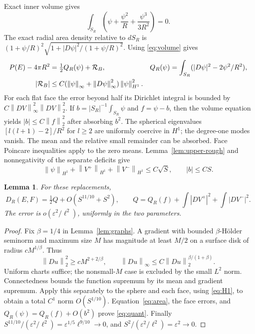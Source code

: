 \documentclass[11pt]{article}
\newcommand{\eps}{\varepsilon}
\newcommand{\norm}[1]{\left\|#1\right\|}
\newtheorem{lemma}[theorem]{Lemma}
\theoremstyle{remark}\newtheorem{remark}[theorem]{Remark}
\numberwithin{equation}{section}
\begin{document}
Exact inner volume gives
\begin{equation}
 \int_{S_R}\left(\psi+\frac{\psi^2}{R}
                  +\frac{\psi^3}{3R^2}\right)=0.\label{eq:volume}
\end{equation}
The exact radial area density relative to $dS_R$ is
$(1+\psi/R)^2\sqrt{1+|D\psi|^2/(1+\psi/R)^2}$.
Using \eqref{eq:volume} gives
\begin{align}
 P(E)-4\pi R^2&=\tfrac12 Q_R(\psi)+\mathcal R_B,
 &Q_R(\psi)&=\int_{S_R}(|D\psi|^2-2\psi^2/R^2),\label{eq:area}\\
 |\mathcal R_B|&\leq C(\norm\psi_\infty+
 \norm{D\psi}_\infty^2)\norm\psi_{H^1}^2.\notag
\end{align}
For each flat face the error beyond half its Dirichlet integral is bounded
by $C\norm{DV}_\infty^2\norm{DV}_2^2$.
If $b=|S_R|^{-1}\int_{S_R}\psi$ and $f=\psi-b$, then the volume equation yields
$|b|\leq C\norm f_2^2$ after absorbing $b^2$. The spherical eigenvalues
$[l(l+1)-2]/R^2$ for $l\geq2$ are uniformly coercive in $H^1$;
the degree-one modes vanish. The mean and the relative small remainder
can be absorbed. Face Poincare inequalities apply to the zero means.
Lemma~\ref{lem:upper-rough} and nonnegativity of the separate deficits give
\begin{equation}
 \norm\psi_{H^1}+\norm{V^+}_{H^1}+\norm{V^-}_{H^1}\leq C\sqrt S,
 \qquad |b|\leq CS.\label{eq:H1}
\end{equation}

\begin{lemma}\label{lem:rate}
For these replacements,
\begin{equation}
 D_R(E,F)=\tfrac12 Q+O(S^{11/10}+S^2),\qquad
 Q=Q_R(f)+\int|DV^+|^2+\int|DV^-|^2.\label{eq:quant}
\end{equation}
The error is $o(\eps^2/\ell^2)$, uniformly in the two parameters.
\end{lemma}
\begin{proof}
Fix $\beta=1/4$ in Lemma~\ref{lem:graphs}. A gradient with bounded
$\beta$-Hölder seminorm and maximum size $M$ has magnitude at least
$M/2$ on a surface disk of radius $cM^{1/\beta}$. Thus
\[
 \norm{Du}_2^2\geq cM^{2+2/\beta},\qquad
 \norm{Du}_\infty\leq C\norm{Du}_2^{\beta/(1+\beta)}.
\]
Uniform charts suffice; the nonsmall-$M$ case is excluded by the small
$L^2$ norm. Connectedness bounds the function supremum by its mean and
gradient supremum. Apply this separately to the sphere and each face,
using \eqref{eq:H1}, to obtain a total $C^1$ norm $O(S^{1/10})$.
Equation~\eqref{eq:area}, the face errors, and
$Q_R(\psi)=Q_R(f)+O(b^2)$ prove \eqref{eq:quant}.
Finally $S^{11/10}/(\eps^2/\ell^2)=\eps^{1/5}\ell^{9/10}\to0$,
and $S^2/(\eps^2/\ell^2)=\eps^2\to0$.
\end{proof}
\end{document}
